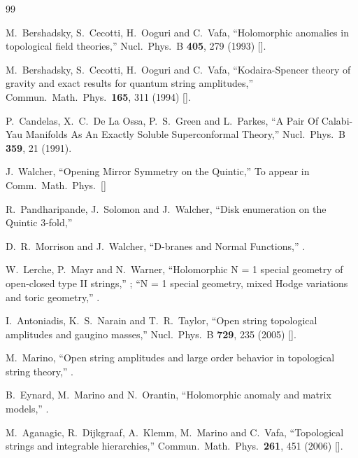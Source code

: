  
\begin{thebibliography}{99}
\renewcommand{\itemsep}{-.2cm}
\small

  M.~Bershadsky, S.~Cecotti, H.~Ooguri and C.~Vafa,
  ``Holomorphic anomalies in topological field theories,''
  Nucl.\ Phys.\  B {\bf 405}, 279 (1993)
  [].

 M.~Bershadsky, S.~Cecotti, H.~Ooguri and C.~Vafa,
  ``Kodaira-Spencer theory of gravity and exact results for quantum string
  amplitudes,''
  Commun.\ Math.\ Phys.\  {\bf 165}, 311 (1994)
  [].

P.~Candelas, X.~C.~De La Ossa, P.~S.~Green and L.~Parkes,
``A Pair Of Calabi-Yau Manifolds As An Exactly Soluble Superconformal
Theory,''
Nucl.\ Phys.\ B {\bf 359}, 21 (1991).

J.~Walcher,
``Opening Mirror Symmetry on the Quintic,''
To appear in Comm.\ Math.\ Phys.\ 
[]

R.~Pandharipande, J.~Solomon and J.~Walcher,
``Disk enumeration on the Quintic 3-fold,''

  D.~R.~Morrison and J.~Walcher,
  ``D-branes and Normal Functions,''
  .

W.~Lerche, P.~Mayr and N.~Warner,
``Holomorphic N = 1 special geometry of open-closed type II strings,''
\hepth{0207259};
``N = 1 special geometry, mixed Hodge variations and toric geometry,''
\hepth{0208039}.

  I.~Antoniadis, K.~S.~Narain and T.~R.~Taylor,
  ``Open string topological amplitudes and gaugino masses,''
  Nucl.\ Phys.\  B {\bf 729}, 235 (2005)
  [].

  M.~Marino,
  ``Open string amplitudes and large order behavior in topological string
  theory,''
  .

 B.~Eynard, M.~Marino and N.~Orantin,
  ``Holomorphic anomaly and matrix models,''
  .

M.~Aganagic, R.~Dijkgraaf, A.~Klemm, M.~Marino and C.~Vafa,
``Topological strings and integrable hierarchies,''
Commun.\ Math.\ Phys.\  {\bf 261}, 451 (2006)
[].


\end{thebibliography}
